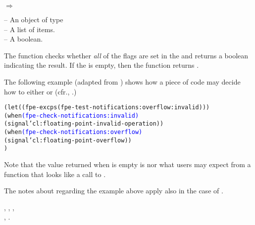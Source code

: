\documentclass[../Exception-Handling.tex]{subfiles}
\begin{document}

\DSyntax{}

   
$\Rightarrow$ 

\DArgsNValues{}

 -- An object of type \\
 -- A list of  items.\\
 -- A boolean.

\DDescription{}

The function checks whether \emph{all} of the  flags
are set in the  and returns a boolean indicating the
result.  If the  is empty, then the function returns
.

\DExamples{}

The following example (adapted from \cite{2018:C18}) shows how a piece of
code may decide how to  either
 or
 (cfr., \cite{1996:ANSIHyperSpec}.)

\begin{alltt}
(let ((fpe-excps (fpe-test-notifications :overflow :invalid)))
   (when \textcolor{blue}{(fpe-check-notifications :invalid)}
     (signal 'cl:floating-point-invalid-operation))
   (when \textcolor{blue}{(fpe-check-notifications :overflow)}
     (signal 'cl:floating-point-overflow))
   )
\end{alltt}

\DNotes{}

Note that the value returned when  is empty is nor what
\CL{} users may expect from a function that looks like a call to
.

The notes about  regarding the example above
apply also in the case of .


\DSeeAlso{}

, ,
,\\
,
.
\end{document}
